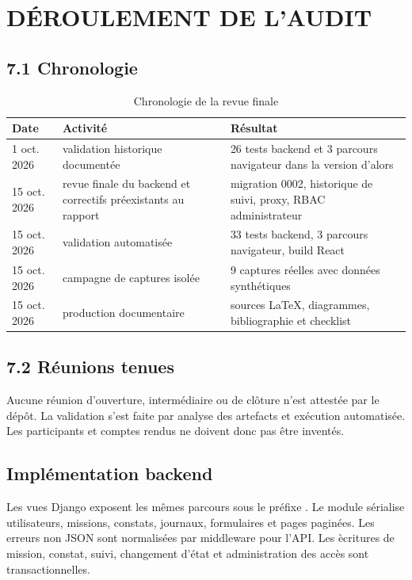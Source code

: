 \chapter{D\'EROULEMENT DE L'AUDIT}

\section*{7.1 Chronologie}
\begin{table}[H]
\centering
\caption{Chronologie de la revue finale}
\begin{tabularx}{\textwidth}{p{3cm}p{4.2cm}X}
\toprule
\rowcolor{AuditLight}Date & Activit\'e & R\'esultat\\
\midrule
1 oct. 2026 & validation historique document\'ee & 26 tests backend et 3 parcours navigateur dans la version d'alors\\
15 oct. 2026 & revue finale du backend et correctifs pr\'eexistants au rapport & migration 0002, historique de suivi, proxy, RBAC administrateur\\
15 oct. 2026 & validation automatis\'ee & 33 tests backend, 3 parcours navigateur, build React\\
15 oct. 2026 & campagne de captures isol\'ee & 9 captures r\'eelles avec donn\'ees synth\'etiques\\
15 oct. 2026 & production documentaire & sources LaTeX, diagrammes, bibliographie et checklist\\
\bottomrule
\end{tabularx}
\end{table}

\section*{7.2 R\'eunions tenues}
Aucune r\'eunion d'ouverture, interm\'ediaire ou de cl\^oture n'est attest\'ee par le d\'ep\^ot. La validation s'est faite par analyse des artefacts et ex\'ecution automatis\'ee. Les participants et comptes rendus ne doivent donc pas \^etre invent\'es.

\section*{Impl\'ementation backend}
Les vues Django exposent les m\^emes parcours sous le pr\'efixe . Le module  s\'erialise utilisateurs, missions, constats, journaux, formulaires et pages pagin\'ees. Les erreurs non JSON sont normalis\'ees par middleware pour l'API. Les \`ecritures de mission, constat, suivi, changement d'\'etat et administration des acc\`es sont transactionnelles.

